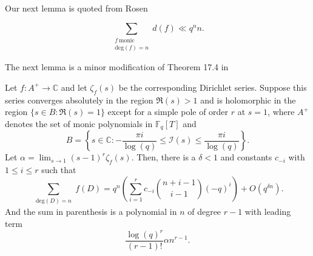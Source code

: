 \documentclass[11pt]{amsart}
\begin{document}
Our next lemma is quoted from Rosen \cite[Proposition 2.5]{Ro}

\begin{lem}
\label{divisorbound}
\begin{equation}
\sum_{\substack{f \ \mathrm{monic} \\ \mathrm{deg}(f)=n}}d(f)\ll q^{n}n.
\end{equation}
\end{lem}

The next lemma is a minor modification of Theorem 17.4 in \cite{Ro}

\begin{lem}
\label{lem4.3}
Let $f:A^{+}\rightarrow\mathbb{C}$ and let $\zeta_{f}(s)$ be the corresponding Dirichlet series. Suppose this series converges absolutely in the region $\mathfrak{R}(s)>1$ and is holomorphic in the region $\{s\in B:\mathfrak{R}(s)=1\}$ except for a simple pole of order $r$ at $s=1$, where $A^{+}$ denotes the set of monic polynomials in $\mathbb{F}_{q}[T]$ and 
$$B=\left\{s\in\mathbb{C}:-\frac{\pi i}{\log(q)}\leq\mathcal{I}(s)\leq\frac{\pi i}{\log(q)}\right\}.$$
Let $\alpha=\lim_{s\rightarrow1}(s-1)^{r}\zeta_{f}(s)$. Then, there is a $\delta<1$ and constants $c_{-i}$ with $1\leq i\leq r$ such that
\begin{equation}
\sum_{\substack{\mathrm{deg}(D)=n}}f(D)=q^{n}\left(\sum_{i=1}^{r}c_{-i}\binom{n+i-1}{i-1}(-q)^{i}\right)+O(q^{\delta n}).
\end{equation}
And the sum in parenthesis is a polynomial in $n$ of degree $r-1$ with leading term
$$\frac{\log(q)^{r}}{(r-1)!}\alpha n^{r-1}.$$
\end{lem}
\end{document}

